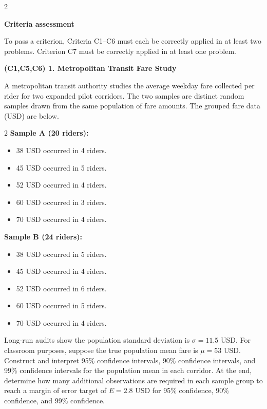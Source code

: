 \documentclass[12pt]{article}
\newcommand{\SubsectionBox}[1]{%
	\noindent\colorbox{gray!30}{%
		\parbox{\linewidth}{\textbf{#1}}%
	}\par\vspace{0.35cm}%
}
\begin{document}
	\begin{multicols}{2}
		\SubsectionBox{Criteria assessment}\vspace{-0.25cm}
		To pass a criterion, Criteria C1–C6 must each be correctly applied in at least two problems. Criterion C7 must be correctly applied in at least one problem.

		\vspace{0.25cm}
		\SubsectionBox{(C1,C5,C6) 1. Metropolitan Transit Fare Study}\vspace{-0.25cm}
		A metropolitan transit authority studies the average weekday fare collected per rider for two expanded pilot corridors.
		The two samples are distinct random samples drawn from the same population of fare amounts.
		The grouped fare data (USD) are below.

		\begin{multicols}{2}
			\textbf{Sample A (20 riders):}
			\begin{itemize}
				\item 38 USD occurred in 4 riders.
				\item 45 USD occurred in 5 riders.
				\item 52 USD occurred in 4 riders.
				\item 60 USD occurred in 3 riders.
				\item 70 USD occurred in 4 riders.
			\end{itemize}

			\columnbreak

			\textbf{Sample B (24 riders):}
			\begin{itemize}
				\item 38 USD occurred in 5 riders.
				\item 45 USD occurred in 4 riders.
				\item 52 USD occurred in 6 riders.
				\item 60 USD occurred in 5 riders.
				\item 70 USD occurred in 4 riders.
			\end{itemize}
		\end{multicols}

		Long-run audits show the population standard deviation is $\sigma = 11.5$ USD.
		For classroom purposes, suppose the true population mean fare is $\mu = 53$ USD.
		Construct and interpret 95\% confidence intervals, 90\% confidence intervals, and 99\% confidence intervals for the population mean in each corridor.
		At the end, determine how many additional observations are required in each sample group to reach a margin of error target of $E = 2.8$ USD for 95\% confidence, 90\% confidence, and 99\% confidence.


\end{multicols}
\end{document}
